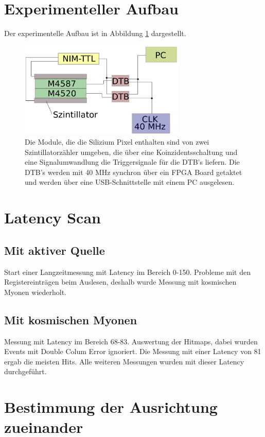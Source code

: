 \documentclass[usenames,dvipsnames]{include/protokollclass}
\begin{document}
	\section{Experimenteller Aufbau}
	Der experimentelle Aufbau ist in Abbildung \ref{fig:aufbau} dargestellt.
	\begin{figure}
		\centering
		\includegraphics[width=0.7\textwidth]{fig/aufbau.eps}
		\caption{Die Module, die die Silizium Pixel enthalten sind von zwei Szintillatorzähler umgeben, die über eine Koinzidentsschaltung und eine Signalumwandlung die Triggersignale für die DTB's liefern. Die DTB's werden mit 40 MHz synchron über ein FPGA Board getaktet und werden über eine USB-Schnittstelle mit einem PC ausgelesen.}
		\label{fig:aufbau}
	\end{figure}

	\section{Latency Scan}
	\subsection{Mit aktiver Quelle}
	Start einer Langzeitmessung mit Latency im Bereich 0-150. 
	Probleme mit den Registereinträgen beim Auslesen, deshalb wurde Messung mit kosmischen Myonen wiederholt. 
	\subsection{Mit kosmischen Myonen}
	Messung mit Latency im Bereich 68-83. Auswertung der Hitmaps, dabei wurden Events mit Double Colum Error ignoriert. Die Messung mit einer Latency von 81 ergab die meisten Hits. Alle weiteren Messungen wurden mit dieser Latency durchgeführt.
	
	\section{Bestimmung der Ausrichtung zueinander}
	
\end{document}
